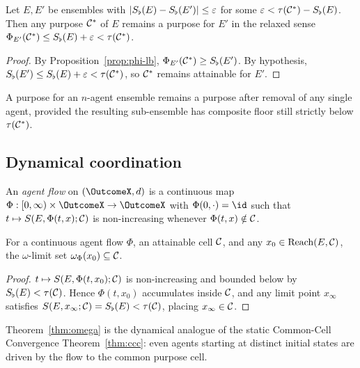 \begin{theorem}\label{thm:purp-stab}
Let $E,E'$ be ensembles with $|S_{\flat}(E)-S_{\flat}(E')|\le\varepsilon$ for some
$\varepsilon<\tau(\mathcal{C}^*)-S_{\flat}(E)$. Then any purpose $\mathcal{C}^*$ of $E$ remains
a purpose for $E'$ in the relaxed sense
$\Phi_{E'}(\mathcal{C}^*)\le S_{\flat}(E)+\varepsilon<\tau(\mathcal{C}^*)$.
\end{theorem}

\begin{proof}
By Proposition~\ref{prop:phi-lb}, $\Phi_{E'}(\mathcal{C}^*)\ge S_{\flat}(E')$.
By hypothesis, $S_{\flat}(E')\le S_{\flat}(E)+\varepsilon<\tau(\mathcal{C}^*)$, so $\mathcal{C}^*$
remains attainable for $E'$.
\end{proof}

\begin{corollary}\label{cor:dropout}
A purpose for an $n$-agent ensemble remains a purpose after removal of any
single agent, provided the resulting sub-ensemble has composite floor still
strictly below $\tau(\mathcal{C}^*)$.
\end{corollary}

\subsection{Dynamical coordination}

\begin{definition}\label{def:flow}
An \emph{agent flow} on $(\OutcomeX,d)$ is a continuous map
$\Phi:[0,\infty)\times\OutcomeX\to\OutcomeX$ with $\Phi(0,\cdot)=\id$
such that $t\mapsto S(E,\Phi(t,x);\mathcal{C})$ is non-increasing whenever
$\Phi(t,x)\notin\mathcal{C}$.
\end{definition}

\begin{theorem}\label{thm:omega}
For a continuous agent flow $\Phi$, an attainable cell $\mathcal{C}$, and any
$x_0\in\operatorname{Reach}(E,\mathcal{C})$, the $\omega$-limit set
$\omega_\Phi(x_0)\subseteq\mathcal{C}$.
\end{theorem}

\begin{proof}
$t\mapsto S(E,\Phi(t,x_0);\mathcal{C})$ is non-increasing and bounded below by
$S_{\flat}(E)<\tau(\mathcal{C})$. Hence $\Phi(t,x_0)$ accumulates inside $\mathcal{C}$,
and any limit point $x_\infty$ satisfies $S(E,x_\infty;\mathcal{C})=S_{\flat}(E)
<\tau(\mathcal{C})$, placing $x_\infty\in\mathcal{C}$.
\end{proof}

Theorem~\ref{thm:omega} is the dynamical analogue of the static
Common-Cell Convergence Theorem~\ref{thm:ccc}: even agents starting at
distinct initial states are driven by the flow to the common purpose cell.

